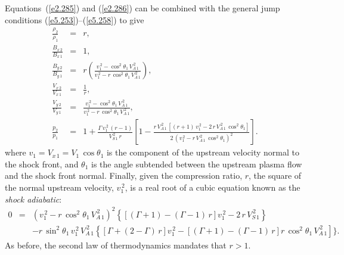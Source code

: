 Equations~(\ref{e2.285}) and (\ref{e2.286}) can be combined with the
general jump conditions (\ref{e5.253})--(\ref{e5.258})
to give
\begin{eqnarray}
\frac{\rho_2}{\rho_1}&=& r,\\[0.5ex]
\frac{B_{x\,2}}{B_{x\,1}}&=& 1,\\[0.5ex]
\frac{B_{y\,2}}{B_{y\,1}}&=& 
r\left(\frac{v_{1}^{\,2} - \cos^2\theta_1\,V_{A\,1}^{\,2}}{v_{1}^{\,2}-r\,\cos^2\theta_1\,V_{A\,1}^{\,2}}\right),\label{e5.289}\\[0.5ex]
\frac{V_{x\,2}}{V_{x\,1}}&=& \frac{1}{r},\\[0.5ex]
\frac{V_{y\,2}}{V_{y\,1}}&=& 
\frac{v_{1}^{\,2} -\cos^2\theta_1\, V_{A\,1}^{\,2}}{v_{1}^{\,2}-r\,\cos^2\theta_1\,V_{A\,1}^{\,2}},\label{e5.291}\\[0.5ex]
\frac{p_2}{p_1}&=& 1  + \frac{\Gamma\,v_1^{\,2}\,(r-1)}{V_{S\,1}^{\,2}\,r}
\left[1 - \frac{r\,V_{A\,1}^{\,2}\,[(r+1)\,v_1^{\,2}-2\,r\,V_{A\,1}^{\,2}\,\cos^2\theta_1]}
{2\,(v_1^{\,2}-r\,V_{A\,1}^{\,2}\,\cos^2\theta_1)^2}\right].
\end{eqnarray}
where $v_1= V_{x\,1} = V_1\,\cos\theta_1$ is the component of the upstream velocity normal to the
shock front, 
and $\theta_1$ is the angle subtended between the upstream plasma flow and the
shock front normal. Finally, given the compression ratio, $r$,  the square of the normal
upstream velocity, $v_1^{\,2}$, is a real root of a cubic equation
known as the {\em shock adiabatic}:
\begin{eqnarray}
0&=&(v_{1}^{\,2}-r\,\cos^2\theta_1\,V_{A\,1}^{\,2})^2\left\{
\left[(\Gamma+1)-(\Gamma-1)\,r\right]
v_{1}^{\,2}- 2\,r\,V_{S\,1}^{\,2}\right\}\\[0.5ex]
&&-r\,\sin^2\theta_1\,v_{1}^{\,2}\,V_{A\,1}^{\,2}\left\{
\left[\Gamma+ (2-\Gamma)\,r\right]v_{1}^{\,2}
-\left[(\Gamma+1)-(\Gamma-1)\,r\right]r\,\cos^2\theta_1\,V_{A\,1}^{\,2}\right]\}.\nonumber
\end{eqnarray}
As before, the second law of thermodynamics mandates that $r>1$. 

